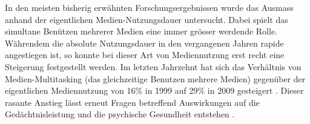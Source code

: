 In den meisten bisherig erwähnten Forschungsergebnissen wurde das Ausmass anhand der eigentlichen Medien-Nutzungsdauer untersucht. Dabei spielt das simultane Benützen mehrerer Medien eine immer grösser werdende Rolle. Währendem die absolute Nutzungsdauer in den vergangenen Jahren rapide angestiegen ist, so konnte bei dieser Art von Mediennutzung erst recht eine Steigerung festgestellt werden. Im letzten Jahrzehnt hat sich das Verhältnis von Medien-Multitasking (das gleichzeitige Benutzen mehrere Medien) gegenüber der eigentlichen Mediennutzung von 16\% in 1999 auf 29\% in 2009 gesteigert \cite{Rideout2010}. Dieser rasante Anstieg lässt erneut Fragen betreffend Auswirkungen auf die Gedächtnisleistung und die psychische Gesundheit entstehen \cite{Alzahabi2013}. 

